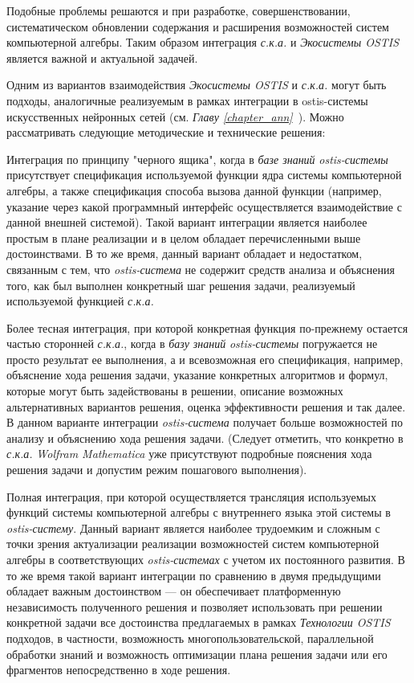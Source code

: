 Подобные проблемы решаются и при разработке, совершенствовании, систематическом обновлении содержания и расширения возможностей систем компьютерной алгебры. Таким образом интеграция \textit{с.к.а.} и \textit{Экосистемы OSTIS} является важной и актуальной задачей.

Одним из вариантов взаимодействия \textit{Экосистемы OSTIS} и \textit{с.к.а.} могут быть подходы, аналогичные реализуемым в рамках интеграции в ostis-системы искусственных нейронных сетей (см. \textit{Главу \ref{chapter_ann}~}). Можно рассматривать следующие методические и технические решения:
\begin{textitemize}
	\item Интеграция по принципу "черного ящика"{}, когда в \textit{базе знаний} \textit{ostis-системы} присутствует спецификация используемой функции ядра системы компьютерной алгебры, а также спецификация способа вызова данной функции (например, указание через какой программный интерфейс осуществляется взаимодействие с данной внешней системой). Такой вариант интеграции является наиболее простым в плане реализации и в целом обладает перечисленными выше достоинствами. В то же время, данный вариант обладает и недостатком, связанным с тем, что \textit{ostis-система} не содержит средств анализа и объяснения того, как был выполнен конкретный шаг решения задачи, реализуемый используемой функцией \textit{с.к.а.}
	\item Более тесная интеграция, при которой конкретная функция по-прежнему остается частью сторонней \textit{с.к.а.}, когда в \textit{базу знаний} \textit{ostis-системы} погружается не просто результат ее выполнения, а и всевозможная его спецификация, например, объяснение хода решения задачи, указание конкретных алгоритмов и формул, которые могут быть задействованы в решении, описание возможных альтернативных вариантов решения, оценка эффективности решения и так далее. В данном варианте интеграции \textit{ostis-система} получает больше возможностей по анализу и объяснению хода решения задачи. (Следует отметить, что конкретно в \textit{с.к.а.} \textit{Wolfram Mathematica} уже присутствуют подробные пояснения хода решения задачи и допустим режим пошагового выполнения).
	\item Полная интеграция, при которой осуществляется трансляция используемых функций системы компьютерной алгебры с внутреннего языка этой системы в \textit{ostis-систему}. Данный вариант является наиболее трудоемким и сложным с точки зрения актуализации реализации возможностей систем компьютерной алгебры в соответствующих \textit{ostis-системах} с учетом их постоянного развития. В то же время такой вариант интеграции по сравнению в двумя предыдущими обладает важным достоинством --- он обеспечивает платформенную независимость полученного решения и позволяет использовать при решении конкретной задачи все достоинства предлагаемых в рамках \textit{Технологии OSTIS} подходов, в частности, возможность многопользовательской, параллельной обработки знаний и возможность оптимизации плана решения задачи или его фрагментов непосредственно в ходе решения.
\end{textitemize}

